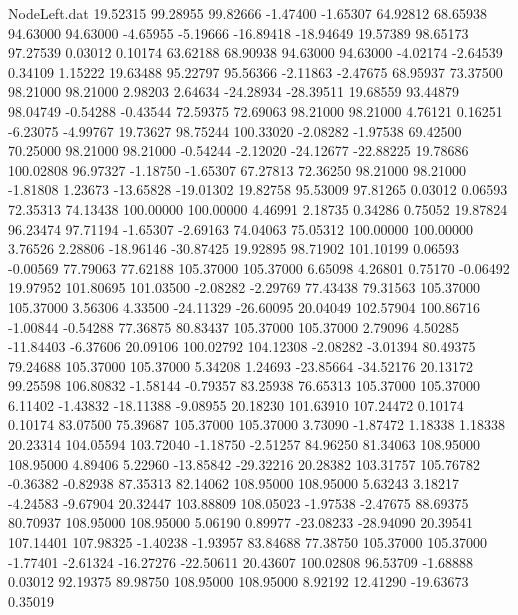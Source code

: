 \begin{filecontents}{NodeLeft.dat}
  19.52315   99.28955   99.82666    -1.47400   -1.65307   64.92812   68.65938   94.63000   94.63000   -4.65955   -5.19666  -16.89418  -18.94649
  19.57389   98.65173   97.27539     0.03012    0.10174   63.62188   68.90938   94.63000   94.63000   -4.02174   -2.64539    0.34109    1.15222
  19.63488   95.22797   95.56366    -2.11863   -2.47675   68.95937   73.37500   98.21000   98.21000    2.98203    2.64634  -24.28934  -28.39511
  19.68559   93.44879   98.04749    -0.54288   -0.43544   72.59375   72.69063   98.21000   98.21000    4.76121    0.16251   -6.23075   -4.99767
  19.73627   98.75244  100.33020    -2.08282   -1.97538   69.42500   70.25000   98.21000   98.21000   -0.54244   -2.12020  -24.12677  -22.88225
  19.78686  100.02808   96.97327    -1.18750   -1.65307   67.27813   72.36250   98.21000   98.21000   -1.81808    1.23673  -13.65828  -19.01302
  19.82758   95.53009   97.81265     0.03012    0.06593   72.35313   74.13438  100.00000  100.00000    4.46991    2.18735    0.34286    0.75052
  19.87824   96.23474   97.71194    -1.65307   -2.69163   74.04063   75.05312  100.00000  100.00000    3.76526    2.28806  -18.96146  -30.87425
  19.92895   98.71902  101.10199     0.06593   -0.00569   77.79063   77.62188  105.37000  105.37000    6.65098    4.26801    0.75170   -0.06492
  19.97952  101.80695  101.03500    -2.08282   -2.29769   77.43438   79.31563  105.37000  105.37000    3.56306    4.33500  -24.11329  -26.60095
  20.04049  102.57904  100.86716    -1.00844   -0.54288   77.36875   80.83437  105.37000  105.37000    2.79096    4.50285  -11.84403   -6.37606
  20.09106  100.02792  104.12308    -2.08282   -3.01394   80.49375   79.24688  105.37000  105.37000    5.34208    1.24693  -23.85664  -34.52176
  20.13172   99.25598  106.80832    -1.58144   -0.79357   83.25938   76.65313  105.37000  105.37000    6.11402   -1.43832  -18.11388   -9.08955
  20.18230  101.63910  107.24472     0.10174    0.10174   83.07500   75.39687  105.37000  105.37000    3.73090   -1.87472    1.18338    1.18338
  20.23314  104.05594  103.72040    -1.18750   -2.51257   84.96250   81.34063  108.95000  108.95000    4.89406    5.22960  -13.85842  -29.32216
  20.28382  103.31757  105.76782    -0.36382   -0.82938   87.35313   82.14062  108.95000  108.95000    5.63243    3.18217   -4.24583   -9.67904
  20.32447  103.88809  108.05023    -1.97538   -2.47675   88.69375   80.70937  108.95000  108.95000    5.06190    0.89977  -23.08233  -28.94090
  20.39541  107.14401  107.98325    -1.40238   -1.93957   83.84688   77.38750  105.37000  105.37000   -1.77401   -2.61324  -16.27276  -22.50611
  20.43607  100.02808   96.53709    -1.68888    0.03012   92.19375   89.98750  108.95000  108.95000    8.92192   12.41290  -19.63673    0.35019

\end{filecontents}
